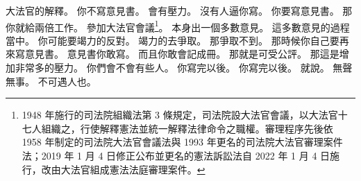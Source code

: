 \hypertarget{c01:cue:297}{}大法官的解釋。
\hypertarget{c01:cue:298}{}你不寫意見書。
\hypertarget{c01:cue:299}{}會有壓力。
\hypertarget{c01:cue:300}{}沒有人逼你寫。
\hypertarget{c01:cue:301}{}你要寫意見書。
\hypertarget{c01:cue:302}{}那你就給兩倍工作。
\hypertarget{c01:cue:303}{}參加大法官會議\footnote{1948 年施行的司法院組織法第 3 條規定，司法院設大法官會議，以大法官十七人組織之，行使解釋憲法並統一解釋法律命令之職權。審理程序先後依 1958 年制定的司法院大法官會議法與 1993 年更名的司法院大法官審理案件法；2019 年 1 月 4 日修正公布並更名的憲法訴訟法自 2022 年 1 月 4 日施行，改由大法官組成憲法法庭審理案件。}。
\hypertarget{c01:cue:304}{}本身出一個多數意見。
\hypertarget{c01:cue:305}{}這多數意見的過程當中。
\hypertarget{c01:cue:306}{}你可能要竭力的反對。
\hypertarget{c01:cue:307}{}竭力的去爭取。
\hypertarget{c01:cue:308}{}那爭取不到。
\hypertarget{c01:cue:309}{}那時候你自己要再來寫意見書。
\hypertarget{c01:cue:310}{}意見書你敢寫。
\hypertarget{c01:cue:311}{}而且你敢會記成冊。
\hypertarget{c01:cue:312}{}那就是可受公評。
\hypertarget{c01:cue:313}{}那這是增加非常多的壓力。
\hypertarget{c01:cue:314}{}你們會不會有些人。
\hypertarget{c01:cue:315}{}你寫完以後。
\hypertarget{c01:cue:316}{}你寫完以後。
\hypertarget{c01:cue:317}{}就說。
\hypertarget{c01:cue:318}{}無聲無事。
\hypertarget{c01:cue:319}{}不可遇人也。


